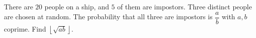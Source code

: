 There are $20$ people on a ship, and $5$ of them are impostors. Three distinct people are chosen at random. The probability that all three are impostors is $\dfrac ab$ with $a,b$ coprime. Find $\left\lfloor\sqrt{ab}\right\rfloor$.
